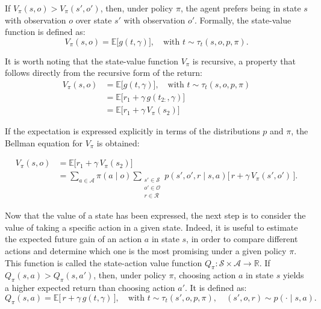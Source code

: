 If \(V_\pi(s, o) > V_\pi(s', o')\), then, under policy \(\pi\), the agent prefers being in state \(s\) with observation \(o\) over state \(s'\) with observation \(o'\).  
Formally, the state-value function is defined as:
\[
V_\pi(s, o) = \mathbb{E}\Big[g(t, \gamma)\Big], \quad \text{with } t \sim \tau_t(s, o, p, \pi).
\]

It is worth noting that the state-value function \(V_\pi\) is recursive, a property that follows directly from the recursive form of the return:
\[
\begin{aligned}
V_\pi(s, o) 
&= \mathbb{E}\Big[g(t, \gamma)\Big], \quad \text{with } t \sim \tau_t(s, o, p, \pi) \\[4pt]
&= \mathbb{E}\Big[r_1 + \gamma \, g(t_{2:}, \gamma)\Big] \\[4pt]
&= \mathbb{E}\Big[r_1 + \gamma \, V_\pi(s_2)\Big]
\end{aligned}
\]

If the expectation is expressed explicitly in terms of the distributions \(p\) and \(\pi\), the Bellman equation for \(V_\pi\) is obtained:

\[
\begin{aligned}
V_\pi(s, o) 
&= \mathbb{E}\Big[r_1 + \gamma \, V_\pi(s_2)\Big] \\[4pt]
&= \sum_{a \in \mathcal{A}} \pi(a \mid o) 
   \sum_{\substack{s' \in \mathcal{S} \\ o' \in \mathcal{O} \\ r \in \mathcal{R}}} 
   p(s', o', r \mid s, a) \Big[\, r + \gamma \, V_\pi(s', o') \,\Big].
\end{aligned}
\]

Now that the value of a state has been expressed, the next step is to consider the value of taking a specific action in a given state.
Indeed, it is useful to estimate the expected future gain of an action \(a\) in state \(s\), in order to compare different actions and determine which one is the most promising under a given policy \(\pi\).
This function is called the state-action value function \(Q_\pi : \mathcal{S} \times \mathcal{A} \to \mathbb{R}\).
If \(Q_\pi(s, a) > Q_\pi(s, a')\), then, under policy \(\pi\), choosing action \(a\) in state \(s\) yields a higher expected return than choosing action \(a'\).
It is defined as:
\[
Q_\pi(s, a) = \mathbb{E}\Big[\, r + \gamma \, g(t, \gamma) \,\Big], \quad \text{with } t \sim \tau_t(s', o, p, \pi), \quad (s', o, r) \sim p(\cdot \mid s, a).
\]

